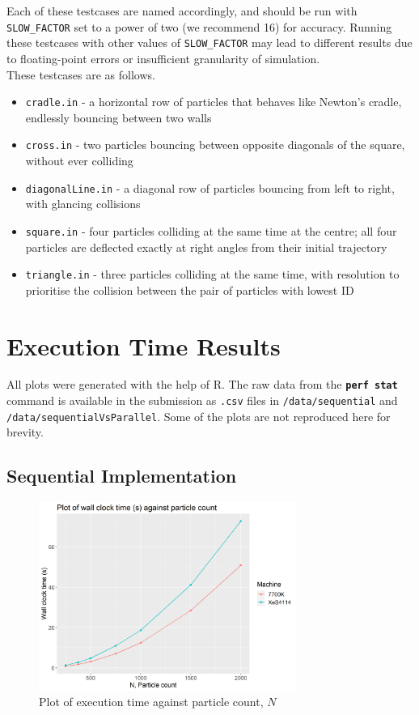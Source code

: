 \documentclass[12pt]{article}
\newcommand{\bt}[1]{\texttt{\textbf{#1}}}
\begin{document}
Each of these testcases are named accordingly, and should be run with \texttt{SLOW\_FACTOR} set to a power of two (we recommend 16) for accuracy. Running these testcases with other values of \texttt{SLOW\_FACTOR} may lead to different results due to floating-point errors or insufficient granularity of simulation. \\

These testcases are as follows.

\begin{itemize}
	\item \texttt{cradle.in} - a horizontal row of particles that behaves like Newton’s cradle, endlessly bouncing between two walls
	\item \texttt{cross.in} - two particles bouncing between opposite diagonals of the square, without ever colliding
	\item \texttt{diagonalLine.in} - a diagonal row of particles bouncing from left to right, with glancing collisions
	\item \texttt{square.in} - four particles colliding at the same time at the centre; all four particles are deflected exactly at right angles from their initial trajectory
	\item \texttt{triangle.in} - three particles colliding at the same time, with resolution to prioritise the collision between the pair of particles with lowest ID
\end{itemize}

\pagebreak

\section{Execution Time Results}

All plots were generated with the help of R. The raw data from the \bt{perf stat} command is available in the submission as \texttt{.csv} files in \texttt{/data/sequential} and \texttt{/data/sequentialVsParallel}. Some of the plots are not reproduced here for brevity.

\subsection{Sequential Implementation}

\begin{figure}[H]
    \centering
    \includegraphics[width=0.75\textwidth]{seq-varyN}
    \caption{Plot of execution time against particle count, $N$}
    \label{fig:seq-varyN}
\end{figure}
\end{document}

